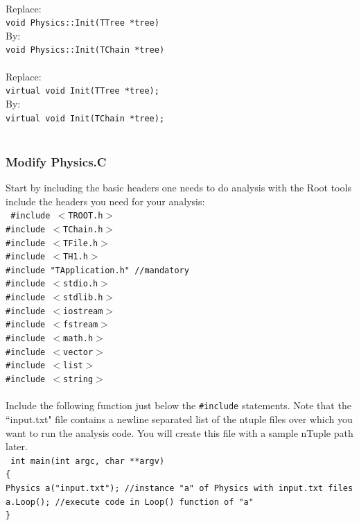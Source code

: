 \documentclass[12pt]{article}
\begin{document}
\\
Replace:\\
\texttt{void Physics::Init(TTree *tree)}\\
By:\\
\texttt{void Physics::Init(TChain *tree)}\\\\
Replace:\\
\texttt{virtual void \hspace{0.5cm}     Init(TTree *tree);}\\
By:\\
\texttt{virtual void \hspace{0.5cm}     Init(TChain *tree);}\\
\\
\newpage
\subsubsection{Modify Physics.C} 
Start by including the basic headers one needs to do analysis with the Root tools include the headers you need for your analysis:\\
\texttt{ 
\#include $<$TROOT.h$>$\\
\#include $<$TChain.h$>$\\
\#include $<$TFile.h$>$\\
\#include $<$TH1.h$>$\\
\#include "TApplication.h"            //mandatory\\
\#include $<$stdio.h$>$\\
\#include $<$stdlib.h$>$\\
\#include $<$iostream$>$\\
\#include $<$fstream$>$\\
\#include $<$math.h$>$\\
\#include $<$vector$>$\\
\#include $<$list$>$\\
\#include $<$string$>$\\
}
\\
Include the following function just below the \texttt{\#include} statements.  Note that the ``input.txt" file contains a newline separated list of the ntuple files over which you want to run the analysis code.  You will create this file with a sample nTuple path later.\\
\texttt{
\hspace*{0.0cm}int main(int argc, char **argv)\\
\hspace*{0.0cm}\{  \\
\hspace*{0.4cm}Physics a("input.txt"); //instance "a" of Physics with input.txt files\\
\hspace*{0.4cm}a.Loop(); \hspace{3cm}//execute code in Loop() function of "a"\\
\hspace*{0.0cm}\}\\
}
\end{document}

